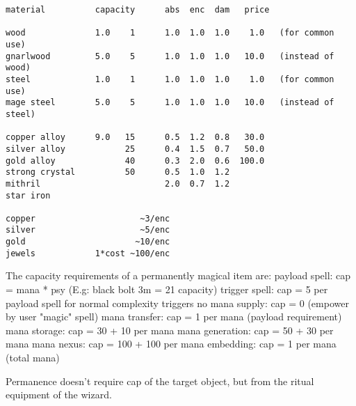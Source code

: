 \small \begin{verbatim}
material          capacity      abs  enc  dam   price

wood              1.0    1      1.0  1.0  1.0    1.0   (for common use)
gnarlwood         5.0    5      1.0  1.0  1.0   10.0   (instead of wood)
steel             1.0    1      1.0  1.0  1.0    1.0   (for common use)
mage steel        5.0    5      1.0  1.0  1.0   10.0   (instead of steel)

copper alloy      9.0   15      0.5  1.2  0.8   30.0
silver alloy            25      0.4  1.5  0.7   50.0
gold alloy              40      0.3  2.0  0.6  100.0
strong crystal          50      0.5  1.0  1.2
mithril                         2.0  0.7  1.2
star iron

copper                     ~3/enc
silver                     ~5/enc
gold                      ~10/enc
jewels            1*cost ~100/enc

\end{verbatim} \normalsize

The capacity requirements of a permanently magical item are:
payload spell: cap = mana * psy (E.g: black bolt 3m = 21 capacity)
trigger spell: cap = 5 per payload spell for normal complexity triggers
no mana supply: cap = 0 (empower by user "magic" spell)
mana transfer: cap = 1 per mana (payload requirement)
mana storage: cap = 30 + 10 per mana
mana generation: cap = 50 + 30 per mana
mana nexus: cap = 100 + 100 per mana
embedding: cap = 1 per mana (total mana)

Permanence doesn't require cap of the target object, but from the ritual equipment of the wizard.

